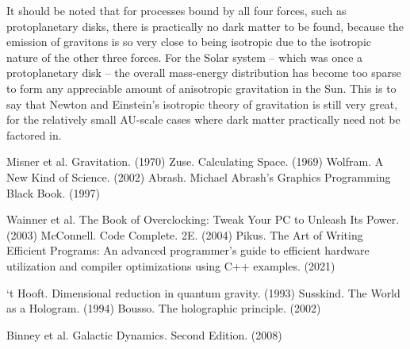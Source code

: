 \documentclass[12pt]{article}
\begin{document}
{It should be noted that for processes bound by all four forces, such as protoplanetary disks, there is practically no dark matter to be found, because the emission of gravitons is so very close to being isotropic due to the isotropic nature of the other three forces.
For the Solar system -- which was once a protoplanetary disk -- the overall mass-energy distribution has become too sparse to form any appreciable amount of anisotropic gravitation in the Sun.
This is to say that Newton and Einstein's isotropic theory of gravitation is still very great, for the relatively small AU-scale cases where dark matter practically need not be factored in.








\pagebreak





\begin{thebibliography}{9}
 Misner et al. Gravitation. (1970)
 Zuse. Calculating Space. (1969)
 Wolfram. A New Kind of Science. (2002)
 Abrash. Michael Abrash's Graphics Programming Black Book. (1997)

 Wainner et al. The Book of Overclocking: Tweak Your PC to Unleash Its Power. (2003)
 McConnell. Code Complete. 2E. (2004)
 Pikus. The Art of Writing Efficient Programs: An advanced programmer's guide to efficient hardware utilization and compiler optimizations using C++ examples. (2021)


 `t Hooft. Dimensional reduction in quantum gravity. (1993)
 Susskind. The World as a Hologram. (1994)
 Bousso. The holographic principle. (2002)


 Binney et al. Galactic Dynamics. Second Edition. (2008)


\end{thebibliography}}
\end{document}
